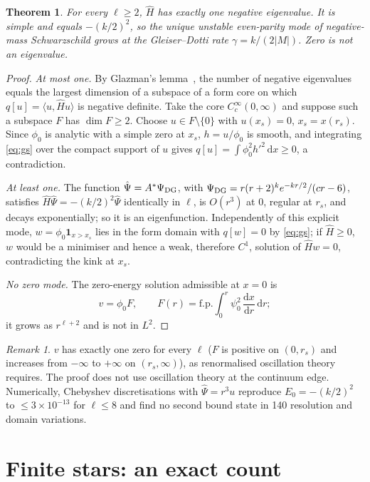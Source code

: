 \documentclass[11pt]{article}
\newtheorem{theorem}{Theorem}
\theoremstyle{remark}
\newtheorem{remark}{Remark}
\newcommand{\Hhat}{\hat{H}}
\newcommand{\dd}{\mathrm{d}}
\begin{document}
\begin{theorem}\label{thm:one}
For every $\ell\ge2$, $\Hhat$ has exactly one negative eigenvalue. It is simple and equals $-(k/2)^2$, so the unique
unstable even-parity mode of negative-mass Schwarzschild grows at the Gleiser--Dotti rate $\gamma=k/(2|M|)$. Zero is
not an eigenvalue.
\end{theorem}

\begin{proof}
\emph{At most one.} By Glazman's lemma~\cite{BirmanSolomyak}, the number of negative eigenvalues equals the largest
dimension of a subspace of a form core on which $q[u]=\langle u,\Hhat u\rangle$ is negative definite. Take the core
$C_c^\infty(0,\infty)$ and suppose such a subspace $F$ has $\dim F\ge2$. Choose $u\in F\setminus\{0\}$ with $u(x_s)=0$,
$x_s=x(r_s)$. Since $\phi_0$ is analytic with a simple zero at $x_s$, $h=u/\phi_0$ is smooth, and integrating
\eqref{eq:gs} over the compact support of $u$ gives $q[u]=\int\phi_0^2h'^2\,\dd x\ge0$, a contradiction.

\emph{At least one.} The function $\hat\Psi=A^*\Psi_{\rm DG}$, with
$\Psi_{\rm DG}=r(r+2)^ke^{-kr/2}/(cr-6)$, satisfies $\Hhat\hat\Psi=-(k/2)^2\hat\Psi$ identically in $\ell$, is
$O(r^3)$ at $0$, regular at $r_s$, and decays exponentially; so it is an eigenfunction. Independently of this explicit
mode, $w=\phi_0\mathbf 1_{x>x_s}$ lies in the form domain with $q[w]=0$ by \eqref{eq:gs}; if $\Hhat\ge0$, $w$ would be a
minimiser and hence a weak, therefore $C^1$, solution of $\Hhat w=0$, contradicting the kink at $x_s$.

\emph{No zero mode.} The zero-energy solution admissible at $x=0$ is
\[
v=\phi_0F,\qquad F(r)=\mathrm{f.p.}\!\int_0^r\psi_0^2\,\frac{\dd x}{\dd r}\,\dd r ;
\]
it grows as $r^{\ell+2}$ and is not in $L^2$.
\end{proof}

\begin{remark}
$v$ has exactly one zero for every $\ell$ ($F$ is positive on $(0,r_s)$ and increases from $-\infty$ to $+\infty$ on
$(r_s,\infty)$), as renormalised oscillation theory~\cite{GST1996} requires. The proof does not use oscillation theory at
the continuum edge. Numerically, Chebyshev discretisations with $\hat\Psi=r^3u$ reproduce $E_0=-(k/2)^2$ to
$\le3\times10^{-13}$ for $\ell\le8$ and find no second bound state in 140 resolution and domain variations.
\end{remark}

\section{Finite stars: an exact count}\label{sec:trunc}
\end{document}
